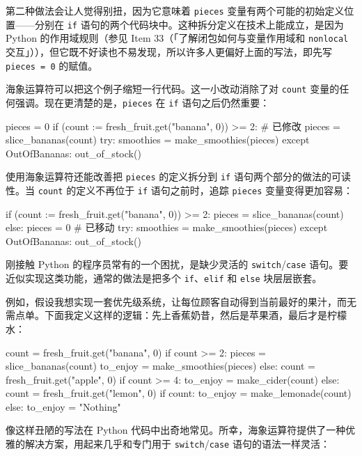 第二种做法会让人觉得别扭，因为它意味着 \texttt{pieces} 变量有两个可能的初始定义位置——分别在 \texttt{if} 语句的两个代码块中。这种拆分定义在技术上能成立，是因为 Python 的作用域规则（参见 Item 33（「了解闭包如何与变量作用域和 \texttt{nonlocal} 交互」）），但它既不好读也不易发现，所以许多人更偏好上面的写法，即先写 \texttt{pieces = 0} 的赋值。

海象运算符可以把这个例子缩短一行代码。这一小改动消除了对 \texttt{count} 变量的任何强调。现在更清楚的是，\texttt{pieces} 在 \texttt{if} 语句之后仍然重要：

\begin{codebox}[python]
pieces = 0
if (count := fresh_fruit.get("banana", 0)) >= 2:  # 已修改
    pieces = slice_bananas(count)
try:
    smoothies = make_smoothies(pieces)
except OutOfBananas:
    out_of_stock()
\end{codebox}

使用海象运算符还能改善把 \texttt{pieces} 的定义拆分到 \texttt{if} 语句两个部分的做法的可读性。当 \texttt{count} 的定义不再位于 \texttt{if} 语句之前时，追踪 \texttt{pieces} 变量变得更加容易：

\begin{codebox}[python]
if (count := fresh_fruit.get("banana", 0)) >= 2:
    pieces = slice_bananas(count)
else:
    pieces = 0  # 已移动
try:
    smoothies = make_smoothies(pieces)
except OutOfBananas:
    out_of_stock()
\end{codebox}

刚接触 Python 的程序员常有的一个困扰，是缺少灵活的 \texttt{switch}/\texttt{case} 语句。要近似实现这类功能，通常的做法是把多个 \texttt{if}、\texttt{elif} 和 \texttt{else} 块层层嵌套。

例如，假设我想实现一套优先级系统，让每位顾客自动得到当前最好的果汁，而无需点单。下面我定义这样的逻辑：先上香蕉奶昔，然后是苹果酒，最后才是柠檬水：

\begin{codebox}[python]
count = fresh_fruit.get("banana", 0)
if count >= 2:
    pieces = slice_bananas(count)
    to_enjoy = make_smoothies(pieces)
else:
    count = fresh_fruit.get("apple", 0)
    if count >= 4:
        to_enjoy = make_cider(count)
    else:
        count = fresh_fruit.get("lemon", 0)
        if count:
            to_enjoy = make_lemonade(count)
        else:
            to_enjoy = "Nothing"
\end{codebox}

像这样丑陋的写法在 Python 代码中出奇地常见。所幸，海象运算符提供了一种优雅的解决方案，用起来几乎和专门用于 \texttt{switch}/\texttt{case} 语句的语法一样灵活：

